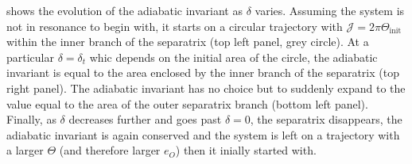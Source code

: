 shows the evolution of the adiabatic 
invariant as $\delta$ varies. Assuming the system is not in resonance
to begin with, it starts on a circular trajectory with $\mathcal{J}
=2\pi\Theta_\text{init}$ within the inner branch of the separatrix
(top left panel, grey circle). At a particular $\delta=\delta_t$
whic depends on the initial area of the circle, the adiabatic 
invariant is equal to the area enclosed by the inner branch of the
separatrix (top right panel). The adiabatic invariant has no choice
but to suddenly expand to the value equal to the area of the
outer separatrix branch (bottom left panel). Finally, as $\delta$
decreases further and goes past $\delta=0$, the separatrix
disappears, the adiabatic invariant is again conserved and the 
system is left on a trajectory with a larger $\Theta$ (and
therefore larger $e_O$) then it inially started with.

